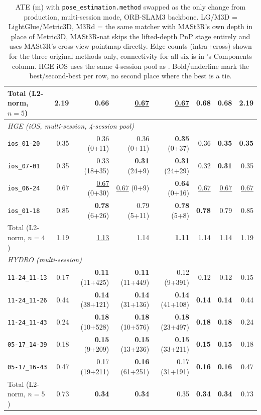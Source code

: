 \begin{table}[htb]
\begin{tabular*}{\textwidth}{@{\extracolsep{\fill}} lrrrrrrr}
  \hline
  Total (L2-norm, $n{=}5$) & 2.19 & \textbf{0.66} & \underline{0.67} & \underline{0.67} & 0.68 & 0.68 & 2.19 \\
  \hline
  \multicolumn{8}{l}{\textit{HGE (iOS, multi-session, 4-session pool)}} \\
  \texttt{ios\_01-20} & 0.35 & 0.36 (0+11) & 0.36 (0+11) & \textbf{0.35} (0+37) & 0.36 & \textbf{0.35} & \textbf{0.35} \\
  \texttt{ios\_07-01} & 0.35 & 0.33 (18+35) & \textbf{0.31} (24+9) & \textbf{0.31} (24+29) & 0.32 & \textbf{0.31} & 0.35 \\
  \texttt{ios\_06-24} & 0.67 & \underline{0.67} (0+30) & \underline{0.67} (0+9) & \textbf{0.64} (0+16) & \underline{0.67} & \underline{0.67} & \underline{0.67} \\
  \texttt{ios\_01-18} & 0.85 & \textbf{0.78} (6+26) & 0.79 (5+11) & \textbf{0.78} (5+8) & \textbf{0.78} & 0.79 & 0.85 \\
  \hline
  Total (L2-norm, $n{=}4$) & 1.19 & \underline{1.13} & 1.14 & \textbf{1.11} & 1.14 & 1.14 & 1.19 \\
  \hline
  \multicolumn{8}{l}{\textit{HYDRO (multi-session)}} \\
  \texttt{11-24\_11-13} & 0.17 & \textbf{0.11} (11+425) & \textbf{0.11} (11+449) & 0.12 (9+391) & 0.12 & 0.12 & 0.15 \\
  \texttt{11-24\_11-26} & 0.44 & \textbf{0.14} (38+121) & \textbf{0.14} (31+136) & \textbf{0.14} (41+108) & \textbf{0.14} & \textbf{0.14} & 0.44 \\
  \texttt{11-24\_11-43} & 0.24 & \textbf{0.18} (10+528) & \textbf{0.18} (10+576) & \textbf{0.18} (23+497) & \textbf{0.18} & \textbf{0.18} & 0.24 \\
  \texttt{05-17\_14-39} & 0.18 & \textbf{0.15} (9+209) & \textbf{0.15} (13+236) & \textbf{0.15} (33+211) & \textbf{0.15} & \textbf{0.15} & 0.18 \\
  \texttt{05-17\_16-43} & 0.47 & 0.17 (19+211) & \textbf{0.16} (61+251) & 0.17 (31+191) & \textbf{0.16} & \textbf{0.16} & 0.47 \\
  \hline
  Total (L2-norm, $n{=}5$) & 0.73 & \textbf{0.34} & \textbf{0.34} & 0.35 & \textbf{0.34} & \textbf{0.34} & 0.73 \\
  \hline
  \end{tabular*}
  \caption[Full-pipeline pose-estimation-method comparison, all 6 methods]{ATE (m) with
    \texttt{pose\_estimation.method} swapped as the only change from production, multi-session
    mode, ORB-SLAM3 backbone. LG/M3D = LightGlue/Metric3D, M3Rd = the same matcher with MASt3R's
    own depth in place of Metric3D, MASt3R-nat skips the lifted-depth PnP stage entirely and uses
    MASt3R's cross-view pointmap directly. Edge counts (intra+cross) shown for the three original
    methods only, connectivity for all six is in 's Components
    column. HGE iOS uses the same 4-session pool as .
    Bold/underline mark the best/second-best per row, no second place where the best is a tie.}
  \label{tab:ablation-pe-kitti}
\end{table}

